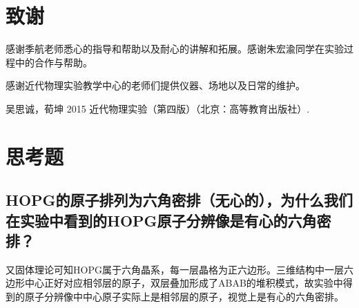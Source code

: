 \documentclass[aps,pre,12pt,preprint,onecolumn,showpacs,showkeys]{revtex4-1}
\begin{document}
\section{致谢}
感谢季航老师悉心的指导和帮助以及耐心的讲解和拓展。感谢朱宏渝同学在实验过程中的合作与帮助。\par
感谢近代物理实验教学中心的老师们提供仪器、场地以及日常的维护。\par
%
\begin{thebibliography}{}
 吴思诚，荀坤 2015 近代物理实验（第四版）（北京：高等教育出版社）.
\end{thebibliography}

\clearpage
\appendix
\section{思考题}
\subsection{HOPG的原子排列为六角密排（无心的），为什么我们在实验中看到的HOPG原子分辨像是有心的六角密排？}
又固体理论可知HOPG属于六角晶系，每一层晶格为正六边形。三维结构中一层六边形中心正好对应相邻层的原子，双层叠加形成了ABAB的堆积模式，故实验中得到的原子分辨像中中心原子实际上是相邻层的原子，视觉上是有心的六角密排。
\end{document}
